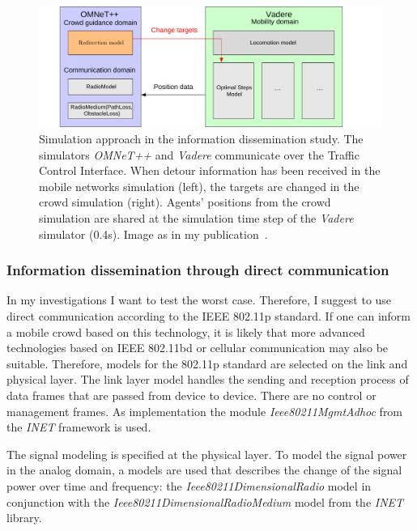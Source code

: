 \begin{figure}[hbt!]
\includegraphics[width=\textwidth,trim={0.2cm 0 1cm 0cm}]{figures/investigation/Informationsverbreitung/ModelInteraction.pdf}  
\caption[Simulation approach in the information dissemination study]{Simulation approach in the information dissemination study. The simulators \textit{OMNeT++} and \textit{Vadere} communicate over the Traffic Control Interface. When detour information has been received in the mobile networks simulation (left), the targets are changed in the crowd simulation (right). Agents' positions from the crowd simulation are shared at the simulation time step of the \textit{Vadere} simulator (0.4s). Image as in my publication~\cite{mayr-2021-com}. }
\label{fig:study1Simulatorsinvolved}
\end{figure}




\subsubsection{Information dissemination through direct communication}

In my investigations I want to test the worst case. Therefore, I suggest to use direct communication according to the IEEE 802.11p standard. If one can inform a mobile crowd based on this technology, it is likely that more advanced technologies based on IEEE 802.11bd or cellular communication may also be suitable. 
Therefore, models for the 802.11p standard are selected on the link and physical layer. The link layer model   handles the sending and reception process of data frames that are passed from device to device. There are no control or management frames. As implementation the module \textit{Ieee80211MgmtAdhoc} from the \textit{INET} framework is used.

The signal modeling is specified at the physical layer. 
To model the signal power in the analog domain, a models are used that describes the change of the signal power over time and frequency: 
 the \textit{Ieee80211DimensionalRadio} model in conjunction with the \textit{Ieee80211DimensionalRadioMedium} model from the \textit{INET} library.

